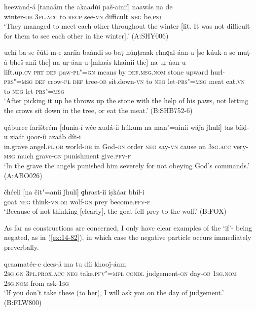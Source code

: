 \begin{exe}
\ex
\label{ex:14-78}
\gll heewand-á [tanaám the akaadúi paš-ainií] naawás  na de \\
winter-\textsc{ob} \textsc{3pl.acc} to \textsc{recp} see-\textsc{vn} difficult \textsc{neg}
be.\textsc{pst} \\
\glt `They managed to meet each other throughout the winter [lit. It was not difficult for them to see each other in the winter].' (A:SHY006)

\ex
\label{ex:14-79}
\gll uc̣hí ba se čúti-m-e zaríia baándi  so baṭ húṇṭraak c̣huɡal-áan-u  [se kúuk-a se muṭ-á bheš-aníi the] na uṛ-áan-u \textsc{[}mhaás khainíi the] na uṛ-áan-u \\
lift.up.\textsc{cv} \textsc{prt} \textsc{def} paw-\textsc{pl"=gn} means by  \textsc{def.msg.nom} stone upward hurl-\textsc{prs"=msg}  \textsc{def} crow-\textsc{pl} \textsc{def} tree-\textsc{ob} sit.down-\textsc{vn} to \textsc{neg} let-\textsc{prs"=msg} meat eat.\textsc{vn} to \textsc{neg} let-\textsc{prs"=msg} \\
\glt `After picking it up he throws up the stone with the help of his paws, not letting the crows sit down in the tree, or eat the meat.' (B:SHB752-6)

\ex
\label{ex:14-80}
\gll qáburee farišteém [dunia-í wée xudá-ii húkum na  man"=ainíi wáǰa
  ǰhulí] tas bíiḍ-u ziaát  ɡoor-íi azaáb dít-i \\
in.grave angel.\textsc{pl.ob} world-\textsc{ob} in God-\textsc{gn} order \textsc{neg}  say-\textsc{vn} cause on \textsc{3sg.acc} very-\textsc{msg} much grave-\textsc{gn} punishment give.\textsc{pfv-f}  \\
\glt `In the grave the angels punished him severely for not obeying God's commands.' (A:ABO026)

\ex
\label{ex:14-81}
\gll čhéeli [na čit"=aníi ǰhulí] ɡhrast-íi iṣkáar bhíl-i \\
goat \textsc{neg} think-\textsc{vn} on wolf-\textsc{gn} prey become.\textsc{pfv-f} \\
\glt `Because of not thinking [clearly], the goat fell prey to the wolf.' (B:FOX)
\end{exe}

As far as  constructions are concerned, I only have clear examples of the `if'- being negated, as in (\ref{ex:14-82}), in which case the negative particle occurs immediately preverbally.

\begin{exe}
\ex
\label{ex:14-82}
  qeaamatée-e dees-á ma tu díi khooǰ-áam \\
\textsc{2sg.gn} \textsc{3pl.prox.acc} \textsc{neg} take.\textsc{pfv"=mpl} \textsc{condl}  judgement-\textsc{gn} day-\textsc{ob} \textsc{1sg.nom} \textsc{2sg.nom} from ask-\textsc{1sg}  \\
\glt `If you don't take these (to her), I will ask you on the day of judgement.' (B:FLW800)
\end{exe}

